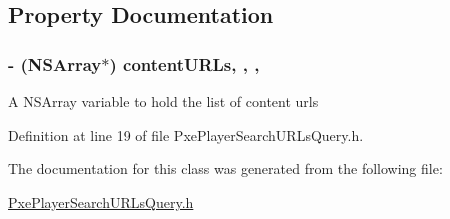 \subsection{Property Documentation}
\hypertarget{interface_pxe_player_search_u_r_ls_query_abb8b87c426ef25427e4ccff33a591e06}{
\subsubsection[{content\-U\-R\-Ls}]{\setlength{\rightskip}{0pt plus 5cm}-\/ (N\-S\-Array$\ast$) content\-U\-R\-Ls\hspace{0.3cm}{\ttfamily [read]}, {\ttfamily [write]}, {\ttfamily [nonatomic]}, {\ttfamily [strong]}}}\label{interface_pxe_player_search_u_r_ls_query_abb8b87c426ef25427e4ccff33a591e06}
A N\-S\-Array variable to hold the list of content urls 

Definition at line 19 of file Pxe\-Player\-Search\-U\-R\-Ls\-Query.\-h.



The documentation for this class was generated from the following file\-:\begin{DoxyCompactItemize}
\item 
\hyperlink{_pxe_player_search_u_r_ls_query_8h}{Pxe\-Player\-Search\-U\-R\-Ls\-Query.\-h}\end{DoxyCompactItemize}
